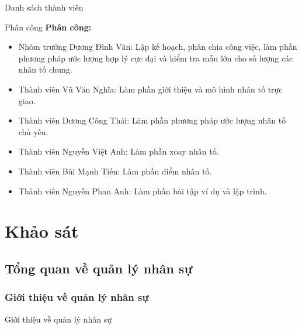 \documentclass{beamer}
\begin{document}
\begin{frame}{Danh sách thành viên}
    \begin{frame}{Phân công}
        \textbf{Phân công:}
        \begin{itemize}
            \item Nhóm trưởng Dương Đình Văn: Lập kế hoạch, phân chia công việc, làm phần phương pháp ước lượng hợp lý cực đại và kiểm tra mẫu lớn cho số lượng các nhân tố chung.
            \item Thành viên Vũ Văn Nghĩa: Làm phần giới thiệu  và mô hình nhân tố trực giao.
            \item Thành viên Dương Công Thái: Làm phần phương pháp ước lượng nhân tố chủ yếu.
            \item Thành viên Nguyễn Việt Anh: Làm phần xoay nhân tố.
            \item Thành viên Bùi Mạnh Tiến: Làm phần điểm nhân tố.
            \item Thành viên Nguyễn Phan Anh: Làm phần bài tập ví dụ và lập trình.
        \end{itemize}
    \end{frame}
\section{Khảo sát}
\subsection{Tổng quan về quản lý nhân sự}
\subsubsection{Giới thiệu về quản lý nhân sự}
\begin{frame}{Giới thiệu về quản lý nhân sự}
\end{frame}


\end{frame}
\end{document}
